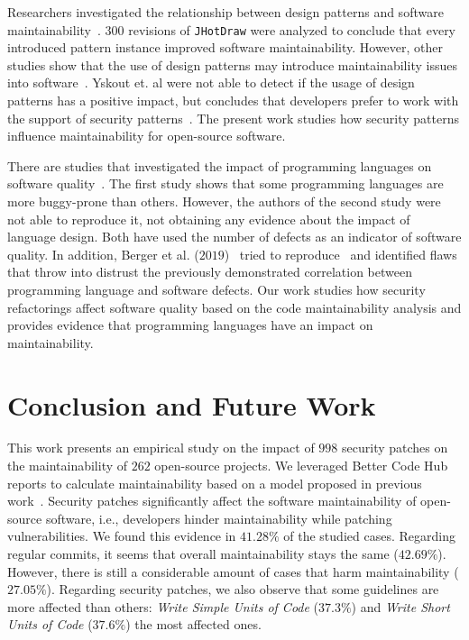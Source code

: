\documentclass[10pt,conference]{IEEEtran}
\begin{document}
Researchers investigated the relationship between design patterns and software
maintainability~\cite{10.1007/978-3-642-35267-6-18}. $300$ revisions of
\texttt{JHotDraw} were analyzed to conclude that every introduced pattern
instance improved software maintainability. However, other studies show that the
use of design patterns may introduce maintainability issues into
software~\cite{4493325}. Yskout et. al were not able to detect if the usage of 
design patterns has a positive impact, but concludes that developers prefer to 
work with the support of security patterns~\cite{8077802}. The present work 
studies how security patterns influence maintainability for open-source software.

There are studies that investigated the impact of programming languages on software
quality~\cite{Ray:2014:LSS:2635868.2635922,Ray:2017:LSP:3144574.3126905}. The first
study shows that some programming languages are more buggy-prone than others. However,
the authors of the second study were not able to reproduce it, not obtaining any
evidence about the impact of language design. Both have used the number of
defects as an indicator of software quality. In addition,
Berger et al. ($2019$)~\cite{2019arXiv190110220B} tried to reproduce~\cite{Ray:2014:LSS:2635868.2635922,
Ray:2017:LSP:3144574.3126905} and identified flaws that throw into distrust the 
previously demonstrated correlation between programming language and software 
defects. Our work studies how security refactorings affect software quality based 
on the code maintainability analysis and provides evidence that programming languages 
have an impact on maintainability.

\section{Conclusion and Future Work}\label{sec:conclusions}

This work presents an empirical study on the impact of $998$ security
patches on the maintainability of $262$ open-source projects. We leveraged
Better Code Hub reports to calculate maintainability based on a model proposed in previous work~\cite{Olivari:2018, cruz2019energyoriented}. Security patches 
significantly affect the software maintainability of open-source software, i.e., 
developers hinder maintainability while patching vulnerabilities. We found this evidence in
$41.28\%$ of the studied cases. Regarding regular commits, it seems that overall
maintainability stays the same ($42.69\%$). However, there is still a 
considerable amount of cases that harm maintainability ($27.05\%$).
Regarding security patches, we also observe that some guidelines are more
affected than others: \emph{Write Simple Units of Code} ($37.3\%$) and
\emph{Write Short Units of Code} ($37.6\%$) the most affected ones. 
\end{document}
